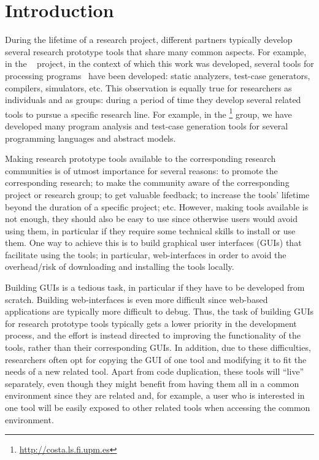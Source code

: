 {%
}

\chapter{Introduction}

During the lifetime of a research project, different partners
typically develop several research prototype tools that share many
common aspects.
%
For example, in the \envisage~\cite{envisage} project, in the context
of which this work was developed, several tools for processing \abs
programs~\cite{johnsen10fmco} have been developed: static analyzers,
test-case generators, compilers, simulators, etc.
%
This observation is equally true for researchers as individuals and as
groups: during a period of time they develop several related tools to
pursue a specific research line. For example, in the
\costa\footnote{\url{http://costa.ls.fi.upm.es}} group, we have
developed many program analysis and test-case generation tools for
several programming languages and abstract models.

Making research prototype tools available to the corresponding
research communities is of utmost importance for several reasons: to
promote the corresponding research; to make the community aware of the
corresponding project or research group; to get valuable feedback; to
increase the tools' lifetime beyond the duration of a specific
project; etc. However, making tools available is not enough, they
should also be easy to use since otherwise users would avoid using
them, in particular if they require some technical skills to install
or use them.
%
One way to achieve this is to build graphical user interfaces (GUIs)
that facilitate using the tools; in particular, web-interfaces in
order to avoid the overhead/risk of downloading and installing the
tools locally.

Building GUIs is a tedious task, in particular if they have to be
developed from scratch. Building web-interfaces is even more difficult
since web-based applications are typically more difficult to debug.
%
Thus, the task of building GUIs for research prototype tools typically
gets a lower priority in the development process, and the effort is
instead directed to improving the functionality of the tools, rather
than their corresponding GUIs. In addition, due to these difficulties,
researchers often opt for copying the GUI of one tool and modifying it
to fit the needs of a new related tool.
%
Apart from code duplication, these tools will ``live'' separately,
even though they might benefit from having them all in a common
environment since they are related and, for example, a user who is
interested in one tool will be easily exposed to other related tools
when accessing the common environment.

